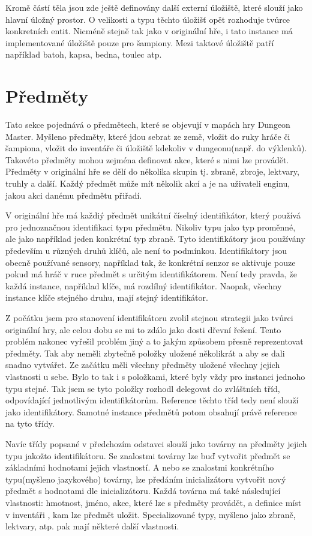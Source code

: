 Kromě částí těla jsou zde ještě definovány další externí úložiště, které slouží jako hlavní úložný prostor. O velikosti
a typu těchto úložišť opět rozhoduje tvůrce konkretních entit. Nicméně stejně tak jako v originální hře, i tato instance má implementované 
úložiště pouze pro šampiony. Mezi taktové úložiště patří například batoh, kapsa, bedna, toulec atp.

\section{Předměty}
Tato sekce pojednává o předmětech, které se objevují v mapách hry Dungeon Master. Myšleno předměty, které jdou sebrat ze země,
vložit do ruky hráče či šampiona, vložit do inventáře či úložiště kdekoliv v dungeonu(např. do výklenků). Takovéto předměty 
mohou zejména definovat akce, které s nimi lze provádět. Předměty v originální hře se dělí do několika skupin tj. zbraně,
zbroje, lektvary, truhly a další. Každý předmět může mít několik akcí a je na uživateli enginu, jakou akci danému předmětu přiřadí.

V originální hře má každiý předmět unikátní číselný identifikátor, který používá pro jednoznačnou identifikaci typu předmětu.
Nikoliv typu jako typ proměnné, ale jako například jeden konkrétní typ zbraně. Tyto identifikátory jsou používány především
u různých druhů klíčů, ale není to podmínkou. Identifikátory jsou obecně používané sensory, například tak, že konkrétní senzor
se aktivuje pouze pokud má hráč v ruce předmět s určitým identifikátorem. Není tedy pravda, že každá instance, například klíče, má
rozdílný identifikátor. Naopak, všechny instance klíče stejného druhu, mají stejný identifikátor.

Z počátku jsem pro stanovení identifikátoru zvolil stejnou strategii jako tvůrci originální hry, ale celou dobu se mi 
to zdálo jako dosti dřevní řešení. Tento problém nakonec vyřešil problém jiný a to jakým způsobem přesně reprezentovat předměty. Tak aby neměli zbytečně
položky uložené několikrát a aby se dali snadno vytvářet. Ze začátku měli všechny předměty uložené 
všechny jejich vlastnosti u sebe. Bylo to tak i s položkami, které byly vždy pro instanci jednoho typu stejné. Tak jsem se
tyto položky rozhodl delegovat do zvláštních tříd, odpovídající jednotlivým identifikátorům. Reference těchto tříd
tedy není slouží jako identifikátory. Samotné instance předmětů potom obsahují právě reference na tyto třídy.

Navíc třídy popsané v předchozím odstavci slouží jako továrny na předměty jejich typu jakožto identifikátoru. Se znalostmi továrny lze buď
vytvořit předmět se základními hodnotami jejich vlastností. A nebo se znalostmi konkrétního typu(myšleno jazykového) továrny, lze předáním inicializátoru vytvořit nový předmět 
s hodnotami dle inicializátoru. Každá továrna má také následující vlastnosti: hmotnost, jméno, akce, které lze s předměty provádět, a definice míst v inventáři
, kam lze předmět uložit. Specializované typy, myšleno jako zbraně, lektvary, atp. pak mají některé další vlastnosti.

